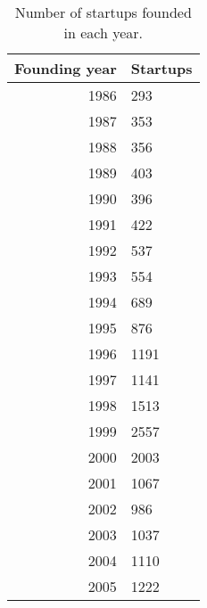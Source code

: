 \begin{table}[!htb]
\centering
\begingroup\small
\begin{tabular}{rl}
  \toprule
Founding year & Startups \\ 
  \midrule
1986 & 293 \\ 
  1987 & 353 \\ 
  1988 & 356 \\ 
  1989 & 403 \\ 
  1990 & 396 \\ 
  1991 & 422 \\ 
  1992 & 537 \\ 
  1993 & 554 \\ 
  1994 & 689 \\ 
  1995 & 876 \\ 
  1996 & 1191 \\ 
  1997 & 1141 \\ 
  1998 & 1513 \\ 
  1999 & 2557 \\ 
  2000 & 2003 \\ 
  2001 & 1067 \\ 
  2002 & 986 \\ 
  2003 & 1037 \\ 
  2004 & 1110 \\ 
  2005 & 1222 \\ 
   \bottomrule
\end{tabular}
\endgroup
\caption{Number of startups founded in each year.} 
\end{table}
